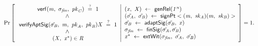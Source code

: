 \begin{definition}[\cnstAptSigCorrectness]
    \[
        \Pr\left[
        \begin{array}{c}
            \:\mathsf{verf}(\mathit{m} ,~ \sigma_{\mathit{fin}} ,~ \mathit{pk}_{\mathit{C}}) ~\stackrel{?}{=}~ 1                                            \\
            ~\land~                                                                                              \\
            \: \mathsf{verifyAptSig}(\hat{\sigma_{\mathit{B}}} ,~ \mathit{m} ,~ \mathit{pk}_{\mathit{A}} ,~ \mathit{pk}_{\mathit{B}}){\mathit{X}} ~\stackrel{?}{=}~ 1 \\
            ~\land~                                                                                              \\
            \:(\mathit{X} ,~ \mathit{x}^*) \in \mathit{R}
        \end{array}
        \middle\vert
        \begin{array}{l}
            (\mathit{x} ,~ \mathit{X}) ~\leftarrow~ \mathsf{genRel}(\mathit{1^n})                                \\
            (\tilde{\sigma_{\mathit{A}}} ,~ \tilde{\sigma_{\mathit{B}}}) ~\leftarrow~ \mathsf{signPt}<(\mathit{m} ,~ \mathit{sk}_{\mathit{A}})(\mathit{m} ,~ \mathit{sk}_{\mathit{B}})> \\
            \hat{\sigma_{\mathit{B}}} ~\leftarrow~ \mathsf{adaptSig}(\tilde{\sigma_{\mathit{B}}} ,~ \mathit{x})                                             \\
            \sigma_{\mathit{fin}} ~\leftarrow~ \mathsf{finSig}(\tilde{\sigma_{\mathit{A}}},\tilde{\sigma_{\mathit{B}}})                                           \\
            \mathit{x}^* ~\leftarrow~ \mathsf{extWit}(\sigma_{\mathit{fin}} ,~ \tilde{\sigma_{\mathit{A}}} ,~ \hat{\sigma_{\mathit{B}}})
        \end{array}
        \right]=1.
    \]
\end{definition}

